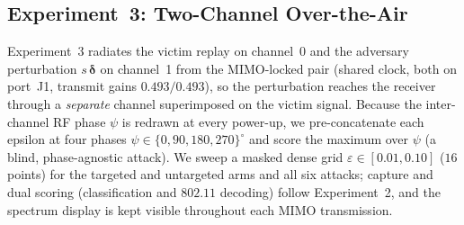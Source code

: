 \documentclass[11pt]{article}
\begin{document}
\subsection{Experiment~3: Two-Channel Over-the-Air}
Experiment~3 radiates the victim replay on channel~0 and the adversary perturbation $s\,\boldsymbol
\delta$ on channel~1 from the MIMO-locked pair (shared clock, both on port~J1, transmit gains
$0.493/0.493$), so the perturbation reaches the receiver through a \emph{separate} channel
superimposed on the victim signal. Because the inter-channel RF phase $\psi$ is redrawn at every
power-up, we pre-concatenate each epsilon at four phases $\psi\in\{0,90,180,270\}^\circ$ and score
the maximum over $\psi$ (a blind, phase-agnostic attack). We sweep a masked dense grid
$\varepsilon\in[0.01,0.10]$ ($16$ points) for the targeted and untargeted arms and all six attacks;
capture and dual scoring (classification and $802.11$ decoding) follow Experiment~2, and the
spectrum display is kept visible throughout each MIMO transmission.
\end{document}
